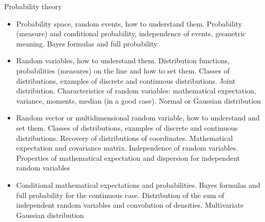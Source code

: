 \documentclass[fullscreen=true, bookmarks=true, hyperref={pdfencoding=unicode}]{beamer}
\begin{document}
\begin{frame}
  Probability theory
  {\scriptsize
  \begin{itemize}
    \item Probability space, random events, how to understand them. 
    Probability (measure) and conditional probability, independence of events, geometric meaning. 
    Bayes formulas and full probability
    \item Random variables, how to understand them. Distribution functions, probabilities (measures) 
    on the line and how to set them. Classes of distributions, examples of discrete and 
    continuous distributions. Joint distribution. Characteristics of random variables: 
    mathematical expectation, variance, moments, median (in a good case). 
    Normal or Gaussian distribution
    \item Random vector or multidimensional random variable, how to understand and set them. 
    Classes of distributions, examples of discrete and continuous distributions. 
    Recovery of distributions of coordinates. Mathematical expectation and covariance matrix. 
    Independence of random variables. Properties of mathematical expectation 
    and dispersion for independent random variables
    \item Conditional mathematical expectations and probabilities. Bayes formulas and 
    full probability for the continuous case. 
    Distribution of the sum of independent random variables and convolution of densities. 
    Multivariate Gaussian distribution
  \end{itemize}
  }

\end{frame}
\end{document}
